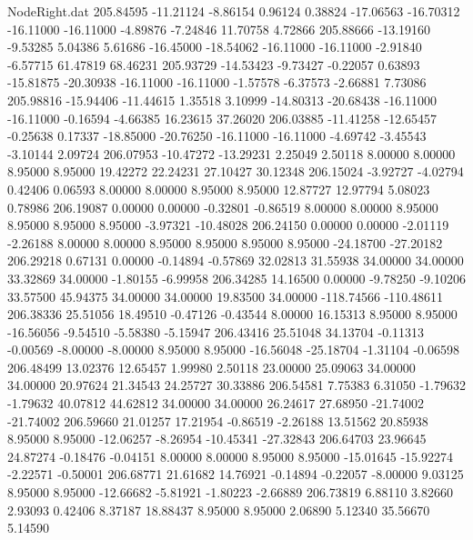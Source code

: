 \begin{filecontents}{NodeRight.dat}
 205.84595  -11.21124   -8.86154     0.96124    0.38824  -17.06563  -16.70312  -16.11000  -16.11000   -4.89876   -7.24846   11.70758    4.72866
 205.88666  -13.19160   -9.53285     5.04386    5.61686  -16.45000  -18.54062  -16.11000  -16.11000   -2.91840   -6.57715   61.47819   68.46231
 205.93729  -14.53423   -9.73427    -0.22057    0.63893  -15.81875  -20.30938  -16.11000  -16.11000   -1.57578   -6.37573   -2.66881    7.73086
 205.98816  -15.94406  -11.44615     1.35518    3.10999  -14.80313  -20.68438  -16.11000  -16.11000   -0.16594   -4.66385   16.23615   37.26020
 206.03885  -11.41258  -12.65457    -0.25638    0.17337  -18.85000  -20.76250  -16.11000  -16.11000   -4.69742   -3.45543   -3.10144    2.09724
 206.07953  -10.47272  -13.29231     2.25049    2.50118    8.00000    8.00000    8.95000    8.95000   19.42272   22.24231   27.10427   30.12348
 206.15024   -3.92727   -4.02794     0.42406    0.06593    8.00000    8.00000    8.95000    8.95000   12.87727   12.97794    5.08023    0.78986
 206.19087    0.00000    0.00000    -0.32801   -0.86519    8.00000    8.00000    8.95000    8.95000    8.95000    8.95000   -3.97321  -10.48028
 206.24150    0.00000    0.00000    -2.01119   -2.26188    8.00000    8.00000    8.95000    8.95000    8.95000    8.95000  -24.18700  -27.20182
 206.29218    0.67131    0.00000    -0.14894   -0.57869   32.02813   31.55938   34.00000   34.00000   33.32869   34.00000   -1.80155   -6.99958
 206.34285   14.16500    0.00000    -9.78250   -9.10206   33.57500   45.94375   34.00000   34.00000   19.83500   34.00000 -118.74566 -110.48611
 206.38336   25.51056   18.49510    -0.47126   -0.43544    8.00000   16.15313    8.95000    8.95000  -16.56056   -9.54510   -5.58380   -5.15947
 206.43416   25.51048   34.13704    -0.11313   -0.00569   -8.00000   -8.00000    8.95000    8.95000  -16.56048  -25.18704   -1.31104   -0.06598
 206.48499   13.02376   12.65457     1.99980    2.50118   23.00000   25.09063   34.00000   34.00000   20.97624   21.34543   24.25727   30.33886
 206.54581    7.75383    6.31050    -1.79632   -1.79632   40.07812   44.62812   34.00000   34.00000   26.24617   27.68950  -21.74002  -21.74002
 206.59660   21.01257   17.21954    -0.86519   -2.26188   13.51562   20.85938    8.95000    8.95000  -12.06257   -8.26954  -10.45341  -27.32843
 206.64703   23.96645   24.87274    -0.18476   -0.04151    8.00000    8.00000    8.95000    8.95000  -15.01645  -15.92274   -2.22571   -0.50001
 206.68771   21.61682   14.76921    -0.14894   -0.22057   -8.00000    9.03125    8.95000    8.95000  -12.66682   -5.81921   -1.80223   -2.66889
 206.73819    6.88110    3.82660     2.93093    0.42406    8.37187   18.88437    8.95000    8.95000    2.06890    5.12340   35.56670    5.14590

\end{filecontents}
